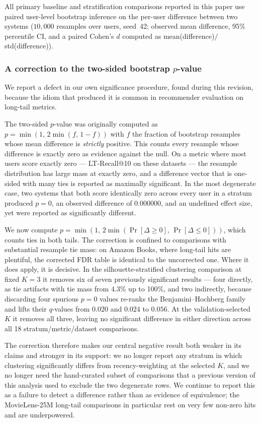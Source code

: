 \documentclass[11pt,a4paper]{article}
\begin{document}
All primary baseline and stratification comparisons reported in this
paper use paired user-level bootstrap inference on the per-user difference between two systems
($10{,}000$ resamples over users, seed~42; observed mean difference, 95\%
percentile CI, and a paired Cohen's $d$ computed as
mean(difference)$/$std(difference)). \subsubsection*{A correction to the two-sided bootstrap $p$-value}
\label{sec:p-value-correction}

We report a defect in our own significance procedure, found during this
revision, because the idiom that produced it is common in recommender
evaluation on long-tail metrics.

The two-sided $p$-value was originally computed as
$p = \min(1,\, 2\min(f,\, 1-f))$ with $f$ the fraction of bootstrap
resamples whose mean difference is \emph{strictly} positive. This counts
every resample whose difference is exactly zero as evidence against the
null. On a metric where most users score exactly zero --- LT-Recall@10 on
these datasets --- the resample distribution has large mass at exactly
zero, and a difference vector that is one-sided with many ties is reported
as maximally significant. In the most degenerate case, two systems that
both score identically zero across every user in a stratum produced
$p = 0$, an observed difference of $0.000000$, and an undefined effect
size, yet were reported as significantly different.

We now compute
$p = \min\!\left(1,\, 2\min\!\left(\Pr[\Delta \geq 0],\, \Pr[\Delta \leq 0]\right)\right)$,
which counts ties in both tails. The correction is confined to
comparisons with substantial resample tie mass: on Amazon Books, where
long-tail hits are plentiful, the corrected FDR table is identical to the
uncorrected one. Where it does apply, it is decisive. In the
silhouette-stratified clustering comparison at fixed $K=3$ it removes six
of seven previously significant results --- four directly, as tie
artifacts with tie mass from 4.3\% up to 100\%, and two indirectly,
because discarding four spurious $p=0$ values re-ranks the
Benjamini--Hochberg family and lifts their $q$-values from $0.020$ and
$0.024$ to $0.056$. At the validation-selected $K$ it removes all three,
leaving no significant difference in either direction across all 18
stratum/metric/dataset comparisons.

The correction therefore makes our central negative result both weaker in
its claims and stronger in its support: we no longer report any stratum in
which clustering significantly differs from recency-weighting at the
selected $K$, and we no longer need the hand-curated subset of
comparisons that a previous version of this analysis used to exclude the
two degenerate rows. We continue to report this as a failure to detect a
difference rather than as evidence of equivalence; the MovieLens-25M
long-tail comparisons in particular rest on very few non-zero hits and are
underpowered.
\end{document}
